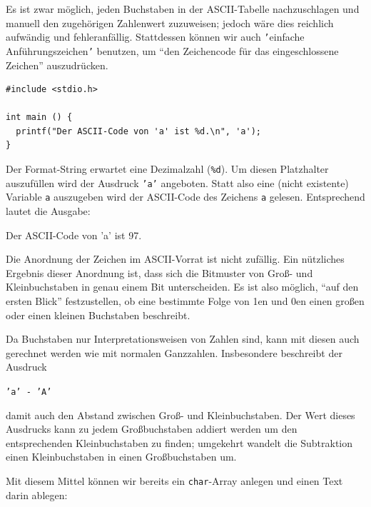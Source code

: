 Es ist zwar möglich, jeden Buchstaben in der ASCII-Tabelle nachzuschlagen und manuell den zugehörigen Zahlenwert zuzuweisen; jedoch wäre dies reichlich aufwändig und fehleranfällig. Stattdessen können wir auch \texttt{'}einfache Anführungszeichen\texttt{'} benutzen, um \enquote{den Zeichencode für das eingeschlossene Zeichen} auszudrücken.

\begin{codebox}
\begin{verbatim}
#include <stdio.h>

int main () {
  printf("Der ASCII-Code von 'a' ist %d.\n", 'a');
}
\end{verbatim}
\end{codebox}

Der Format-String erwartet eine Dezimalzahl (\texttt{\%d}). Um diesen Platzhalter auszufüllen wird der Ausdruck \texttt{'a'} angeboten. Statt also eine (nicht existente) Variable \texttt{a} auszugeben wird der ASCII-Code des Zeichens \texttt{a} gelesen. Entsprechend lautet die Ausgabe:

\begin{cmdbox}
Der ASCII-Code von 'a' ist 97.
\end{cmdbox}

\begin{hintbox}
Die Anordnung der Zeichen im ASCII-Vorrat ist nicht zufällig. Ein nützliches Ergebnis dieser Anordnung ist, dass sich die Bitmuster von Groß- und Kleinbuchstaben in genau einem Bit unterscheiden. Es ist also möglich, \enquote{auf den ersten Blick} festzustellen, ob eine bestimmte Folge von 1en und 0en einen großen oder einen kleinen Buchstaben beschreibt.

Da Buchstaben nur Interpretationsweisen von Zahlen sind, kann mit diesen auch gerechnet werden wie mit normalen Ganzzahlen. Insbesondere beschreibt der Ausdruck
\begin{center}
\texttt{'a' - 'A'}
\end{center}
damit auch den Abstand zwischen Groß- und Kleinbuchstaben. Der Wert dieses Ausdrucks kann zu jedem Großbuchstaben addiert werden um den entsprechenden Kleinbuchstaben zu finden; umgekehrt wandelt die Subtraktion einen Kleinbuchstaben in einen Großbuchstaben um.
\end{hintbox}

Mit diesem Mittel können wir bereits ein \texttt{char}-Array anlegen und einen Text darin ablegen:

